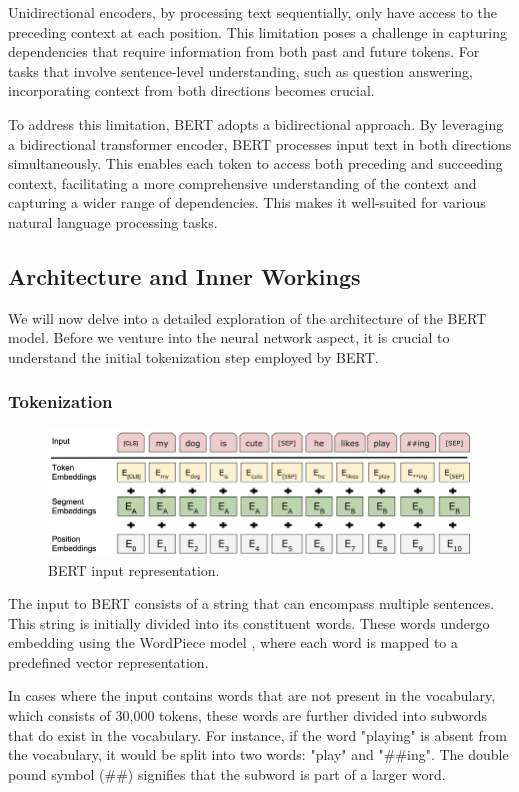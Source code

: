 \documentclass[a4paper,10pt]{report} %
\begin{document}
Unidirectional encoders, by processing text sequentially, only have access to the preceding context at each position. This limitation poses a challenge in capturing dependencies that require information from both past and future tokens. For tasks that involve sentence-level understanding, such as question answering, incorporating context from both directions becomes crucial.

To address this limitation, BERT adopts a bidirectional approach. By leveraging a bidirectional transformer encoder, BERT processes input text in both directions simultaneously. This enables each token to access both preceding and succeeding context, facilitating a more comprehensive understanding of the context and capturing a wider range of dependencies. This makes it well-suited for various natural language processing tasks. \cite{bert}


\subsection{Architecture and Inner Workings}
We will now delve into a detailed exploration of the architecture of the BERT model. Before we venture into the neural network aspect, it is crucial to understand the initial tokenization step employed by BERT.

\subsubsection{Tokenization}
\begin{figure}
  \centering
  \includegraphics[width=12cm]{img/bert_input_representation.png}
  \caption{BERT input representation. \cite{bert}}
  \label{fig:bert_architecture}
\end{figure}
The input to BERT consists of a string that can encompass multiple sentences. This string is initially divided into its constituent words. These words undergo embedding using the WordPiece model \cite{wordpiece}, where each word is mapped to a predefined vector representation.

In cases where the input contains words that are not present in the vocabulary, which consists of 30,000 tokens, these words are further divided into subwords that do exist in the vocabulary. For instance, if the word "playing" is absent from the vocabulary, it would be split into two words: "play" and "\#\#ing". The double pound symbol (\#\#) signifies that the subword is part of a larger word.
\end{document}

